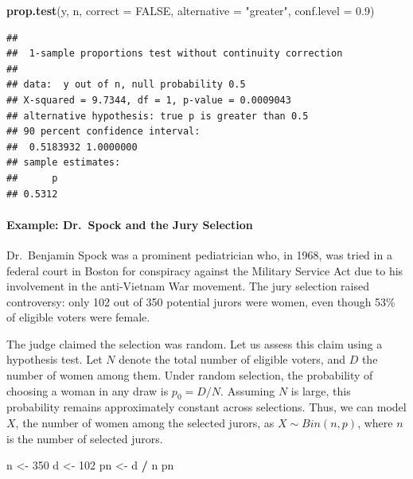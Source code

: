 \documentclass[
]{article}
\newenvironment{Shaded}{\begin{snugshade}}{\end{snugshade}}
\newcommand{\AttributeTok}[1]{\textcolor[rgb]{0.13,0.29,0.53}{#1}}
\newcommand{\ConstantTok}[1]{\textcolor[rgb]{0.56,0.35,0.01}{#1}}
\newcommand{\DecValTok}[1]{\textcolor[rgb]{0.00,0.00,0.81}{#1}}
\newcommand{\FloatTok}[1]{\textcolor[rgb]{0.00,0.00,0.81}{#1}}
\newcommand{\FunctionTok}[1]{\textcolor[rgb]{0.13,0.29,0.53}{\textbf{#1}}}
\newcommand{\NormalTok}[1]{#1}
\newcommand{\OtherTok}[1]{\textcolor[rgb]{0.56,0.35,0.01}{#1}}
\newcommand{\SpecialCharTok}[1]{\textcolor[rgb]{0.81,0.36,0.00}{\textbf{#1}}}
\newcommand{\StringTok}[1]{\textcolor[rgb]{0.31,0.60,0.02}{#1}}
\begin{document}
\begin{Shaded}
\begin{Highlighting}[]
\FunctionTok{prop.test}\NormalTok{(y, n, }\AttributeTok{correct =} \ConstantTok{FALSE}\NormalTok{, }\AttributeTok{alternative =} \StringTok{"greater"}\NormalTok{, }\AttributeTok{conf.level =} \FloatTok{0.9}\NormalTok{)}
\end{Highlighting}
\end{Shaded}

\begin{verbatim}
## 
##  1-sample proportions test without continuity correction
## 
## data:  y out of n, null probability 0.5
## X-squared = 9.7344, df = 1, p-value = 0.0009043
## alternative hypothesis: true p is greater than 0.5
## 90 percent confidence interval:
##  0.5183932 1.0000000
## sample estimates:
##      p 
## 0.5312
\end{verbatim}

\hypertarget{example-dr.-spock-and-the-jury-selection}{%
\paragraph{Example: Dr.~Spock and the Jury
Selection}\label{example-dr.-spock-and-the-jury-selection}}

Dr.~Benjamin Spock was a prominent pediatrician who, in 1968, was tried
in a federal court in Boston for conspiracy against the Military Service
Act due to his involvement in the anti-Vietnam War movement. The jury
selection raised controversy: only 102 out of 350 potential jurors were
women, even though 53\% of eligible voters were female.

The judge claimed the selection was random. Let us assess this claim
using a hypothesis test. Let \(N\) denote the total number of eligible
voters, and \(D\) the number of women among them. Under random
selection, the probability of choosing a woman in any draw is
\(p_0 = D/N\). Assuming \(N\) is large, this probability remains
approximately constant across selections. Thus, we can model \(X\), the
number of women among the selected jurors, as \(X \sim Bin(n,p)\), where
\(n\) is the number of selected jurors.

\begin{Shaded}
\begin{Highlighting}[]
\NormalTok{n }\OtherTok{\textless{}{-}} \DecValTok{350}
\NormalTok{d }\OtherTok{\textless{}{-}} \DecValTok{102}
\NormalTok{pn }\OtherTok{\textless{}{-}}\NormalTok{ d }\SpecialCharTok{/}\NormalTok{ n}
\NormalTok{pn}
\end{Highlighting}
\end{Shaded}
\end{document}
